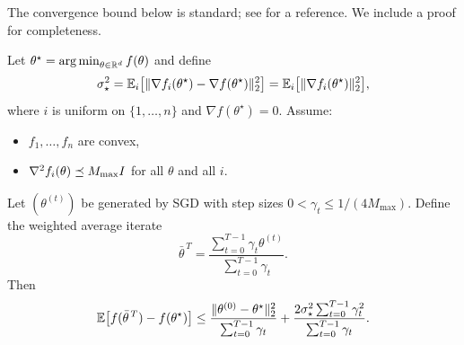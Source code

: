 The convergence bound below is standard; see \citet[Thm.~5.3]{garrigos_gower_2024_handbook} for a reference.
We include a proof for completeness.

\begin{theorem}
\label{thm:sgd-avg-bound}
Let $\theta^\star = \operatorname*{arg\,min}_{\theta\in\mathbb{R}^d} f(\theta)$ and define
\[
\sigma_\star^2 = \mathbb{E}_i\bigl[\lVert\nabla f_i(\theta^\star) - \nabla f(\theta^\star)\rVert_2^2\bigr]
  = \mathbb{E}_i\bigl[\lVert\nabla f_i(\theta^\star)\rVert_2^2\bigr],
\]
where $i$ is uniform on $\{1,\dots,n\}$ and $\nabla f(\theta^\star)=0$.
Assume:
\begin{itemize}[leftmargin=*]
  \item $f_1,\dots,f_n$ are convex,
  \item $\nabla^2 f_i(\theta) \preceq M_{\max} I$ for all $\theta$ and all $i$.
\end{itemize}
Let $(\theta^{(t)})$ be generated by SGD with step sizes $0<\gamma_t \le 1/(4M_{\max})$.
Define the weighted average iterate
\begin{equation}
  \bar\theta^{\,T} = \frac{\sum_{t=0}^{T-1} \gamma_t \theta^{(t)}}{\sum_{t=0}^{T-1} \gamma_t}.
  \label{eq:theta-bar}
\end{equation}
Then
\begin{equation}
  \mathbb{E}\bigl[f(\bar\theta^{\,T}) - f(\theta^\star)\bigr]
  \le
  \frac{\lVert\theta^{(0)}-\theta^\star\rVert_2^2}{\sum_{t=0}^{T-1}\gamma_t}
  + \frac{2\sigma_\star^2 \sum_{t=0}^{T-1}\gamma_t^2}{\sum_{t=0}^{T-1}\gamma_t}.
  \label{eq:sgd-bound}
\end{equation}
\end{theorem}

